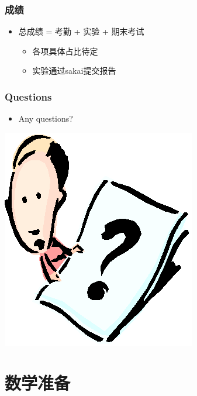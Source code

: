 \documentclass[CJKutf8,dvipsnames,table]{beamer}
\begin{document}
\begin{CJK*}{UTF8}{song}
  \begin{frame}
    \frametitle{成绩}
    \begin{itemize}
    \item 总成绩 = 考勤 + 实验 + 期末考试
        \begin{itemize}   
        \item 各项具体占比待定
        \item 实验通过sakai提交报告 
        \end{itemize}
    \end{itemize}
  \end{frame}

  \begin{frame}
    \frametitle{Questions}
    \begin{itemize}
    \item Any questions?
    \end{itemize}
    \begin{center}
      \includegraphics[scale=.5]{question}
    \end{center}
  \end{frame}
  
  \section{数学准备}
  

\end{CJK*}
\end{document}
